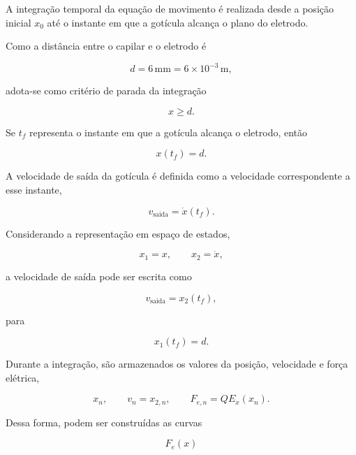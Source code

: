 \documentclass[12pt,a4paper]{article}
\begin{document}
A integração temporal da equação de movimento é realizada desde a posição
inicial $x_0$ até o instante em que a gotícula alcança o plano do eletrodo.

Como a distância entre o capilar e o eletrodo é

\begin{equation}
d
=
6\,\text{mm}
=
6 \times 10^{-3}\,\text{m},
\end{equation}

adota-se como critério de parada da integração

\begin{equation}
x \geq d.
\end{equation}

Se $t_f$ representa o instante em que a gotícula alcança o eletrodo, então

\begin{equation}
x(t_f)
=
d.
\end{equation}

A velocidade de saída da gotícula é definida como a velocidade correspondente
a esse instante,

\begin{equation}
v_{\mathrm{saida}}
=
\dot{x}(t_f).
\end{equation}

Considerando a representação em espaço de estados,

\begin{equation}
x_1 = x,
\qquad
x_2 = \dot{x},
\end{equation}

a velocidade de saída pode ser escrita como

\begin{equation}
v_{\mathrm{saida}}
=
x_2(t_f),
\end{equation}

para

\begin{equation}
x_1(t_f)
=
d.
\end{equation}

Durante a integração, são armazenados os valores da posição, velocidade e
força elétrica,

\begin{equation}
x_n,
\qquad
v_n = x_{2,n},
\qquad
F_{e,n}
=
Q E_x(x_n).
\end{equation}

Dessa forma, podem ser construídas as curvas

\begin{equation}
F_e(x)
\end{equation}
\end{document}
